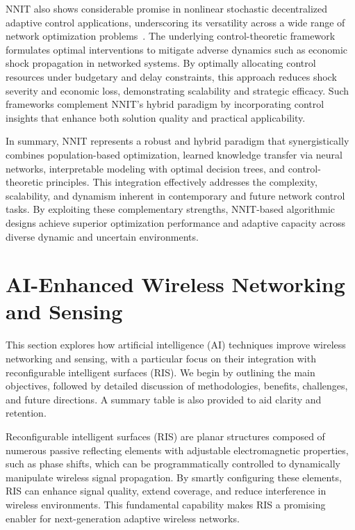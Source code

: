 \documentclass[sigconf]{acmart}
\begin{document}
NNIT also shows considerable promise in nonlinear stochastic decentralized adaptive control applications, underscoring its versatility across a wide range of network optimization problems~\cite{ref40}. The underlying control-theoretic framework formulates optimal interventions to mitigate adverse dynamics such as economic shock propagation in networked systems. By optimally allocating control resources under budgetary and delay constraints, this approach reduces shock severity and economic loss, demonstrating scalability and strategic efficacy. Such frameworks complement NNIT’s hybrid paradigm by incorporating control insights that enhance both solution quality and practical applicability.

In summary, NNIT represents a robust and hybrid paradigm that synergistically combines population-based optimization, learned knowledge transfer via neural networks, interpretable modeling with optimal decision trees, and control-theoretic principles. This integration effectively addresses the complexity, scalability, and dynamism inherent in contemporary and future network control tasks. By exploiting these complementary strengths, NNIT-based algorithmic designs achieve superior optimization performance and adaptive capacity across diverse dynamic and uncertain environments.

\section{AI-Enhanced Wireless Networking and Sensing}

This section explores how artificial intelligence (AI) techniques improve wireless networking and sensing, with a particular focus on their integration with reconfigurable intelligent surfaces (RIS). We begin by outlining the main objectives, followed by detailed discussion of methodologies, benefits, challenges, and future directions. A summary table is also provided to aid clarity and retention.

Reconfigurable intelligent surfaces (RIS) are planar structures composed of numerous passive reflecting elements with adjustable electromagnetic properties, such as phase shifts, which can be programmatically controlled to dynamically manipulate wireless signal propagation. By smartly configuring these elements, RIS can enhance signal quality, extend coverage, and reduce interference in wireless environments. This fundamental capability makes RIS a promising enabler for next-generation adaptive wireless networks.
\end{document}
